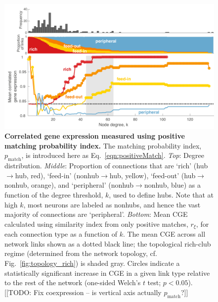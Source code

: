 \documentclass[10pt,letterpaper]{article}
\begin{document}
{%
\begin{figure}[!h]
\centering
    \includegraphics[width=1\textwidth]{meanCoexpressionCoXALL.pdf}
\caption{
\textbf{Correlated gene expression measured using positive matching probability index.}
The matching probability index, $p_\mathrm{match}$, is introduced here as Eq.~\eqref{eqn:positiveMatch}.
\emph{Top}: Degree distribution.
\emph{Middle}: Proportion of connections that are `rich' (hub$\rightarrow$hub, red), `feed-in' (nonhub$\rightarrow$hub, yellow), `feed-out' (hub$\rightarrow$nonhub, orange), and `peripheral' (nonhub$\rightarrow$nonhub, blue) as a function of the degree threshold, $k$, used to define hubs.
Note that at high $k$, most neurons are labeled as nonhubs, and hence the vast majority of connections are `peripheral'.
\emph{Bottom}: Mean CGE calculated using similarity index from only positive matches, $r_\xi$, for each connection type as a function of $k$.
The mean CGE across all network links shown as a dotted black line; the topological rich-club regime (determined from the network topology, cf. Fig.~\ref{fig:topology_rich}) is shaded gray.
Circles indicate a statistically significant increase in CGE in a given link type relative to the rest of the network (one-sided Welch's $t$ test; $p < 0.05$).
\label{fig:RFPposmatches}
[[TODO: Fix coexpression -- is vertical axis actually $p_\mathrm{match}$?]]
}
\end{figure}

}
\end{document}
